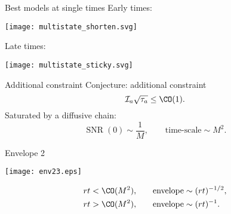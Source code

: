 \documentclass{beamer}%
\DeclareMathOperator{\SNR}{SNR}
\newcommand{\initial}{\mathcal{I}}
\begin{document}

\begin{frame}{Best models at single times}
%
 Early times:
 \begin{center}
   \texttt{[image: multistate\_shorten.svg]}
 \end{center}
 Late times:
 \begin{center}
   \texttt{[image: multistate\_sticky.svg]}
 \end{center}
%
\end{frame}


\begin{frame}{Additional constraint}
%
 Conjecture: additional constraint
 \begin{equation*}
   \initial_a\sqrt{\tau_a} \leq \CO(1).
 \end{equation*}
 Saturated by a diffusive chain:
 \begin{equation*}
   \SNR(0) \sim \frac{1}{M},
   \qquad
   \text{time-scale} \sim M^2.
 \end{equation*}
%
\end{frame}


\begin{frame}{Envelope 2}
%
 \begin{center}
   \texttt{[image: env23.eps]}
 \end{center}

 \begin{equation*}
 \begin{aligned}
   rt &< \CO(M^2), &\quad
   \text{envelope} &\sim (rt)^{-1/2}, \\
   rt &> \CO(M^2), &
   \text{envelope} &\sim (rt)^{-1} .
 \end{aligned}
 \end{equation*}
%
\end{frame}
\end{document}
